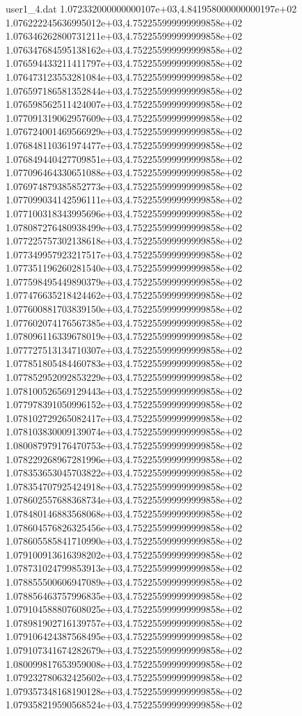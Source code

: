 \begin{filecontents}{user1_4.dat}
1.072332000000000107e+03,4.841958000000000197e+02
1.076222245636995012e+03,4.752255999999999858e+02
1.076346262800731211e+03,4.752255999999999858e+02
1.076347684595138162e+03,4.752255999999999858e+02
1.076594433211411797e+03,4.752255999999999858e+02
1.076473123553281084e+03,4.752255999999999858e+02
1.076597186581352844e+03,4.752255999999999858e+02
1.076598562511424007e+03,4.752255999999999858e+02
1.077091319062957609e+03,4.752255999999999858e+02
1.076724001469566929e+03,4.752255999999999858e+02
1.076848110361974477e+03,4.752255999999999858e+02
1.076849440427709851e+03,4.752255999999999858e+02
1.077096464330651088e+03,4.752255999999999858e+02
1.076974879385852773e+03,4.752255999999999858e+02
1.077099034142596111e+03,4.752255999999999858e+02
1.077100318343995696e+03,4.752255999999999858e+02
1.078087276480938499e+03,4.752255999999999858e+02
1.077225757302138618e+03,4.752255999999999858e+02
1.077349957923217517e+03,4.752255999999999858e+02
1.077351196260281540e+03,4.752255999999999858e+02
1.077598495449890379e+03,4.752255999999999858e+02
1.077476635218424462e+03,4.752255999999999858e+02
1.077600881703839150e+03,4.752255999999999858e+02
1.077602074176567385e+03,4.752255999999999858e+02
1.078096116339678019e+03,4.752255999999999858e+02
1.077727513134710307e+03,4.752255999999999858e+02
1.077851805484460783e+03,4.752255999999999858e+02
1.077852952092853229e+03,4.752255999999999858e+02
1.078100526569129443e+03,4.752255999999999858e+02
1.077978391050996152e+03,4.752255999999999858e+02
1.078102729265082417e+03,4.752255999999999858e+02
1.078103830009139074e+03,4.752255999999999858e+02
1.080087979176470753e+03,4.752255999999999858e+02
1.078229268967281996e+03,4.752255999999999858e+02
1.078353653045703822e+03,4.752255999999999858e+02
1.078354707925424918e+03,4.752255999999999858e+02
1.078602557688368734e+03,4.752255999999999858e+02
1.078480146883568068e+03,4.752255999999999858e+02
1.078604576826325456e+03,4.752255999999999858e+02
1.078605585841710990e+03,4.752255999999999858e+02
1.079100913616398202e+03,4.752255999999999858e+02
1.078731024799853913e+03,4.752255999999999858e+02
1.078855500606947089e+03,4.752255999999999858e+02
1.078856463757996835e+03,4.752255999999999858e+02
1.079104588807608025e+03,4.752255999999999858e+02
1.078981902716139757e+03,4.752255999999999858e+02
1.079106424387568495e+03,4.752255999999999858e+02
1.079107341674282679e+03,4.752255999999999858e+02
1.080099817653959008e+03,4.752255999999999858e+02
1.079232780632425602e+03,4.752255999999999858e+02
1.079357348168190128e+03,4.752255999999999858e+02
1.079358219590568524e+03,4.752255999999999858e+02

\end{filecontents}
